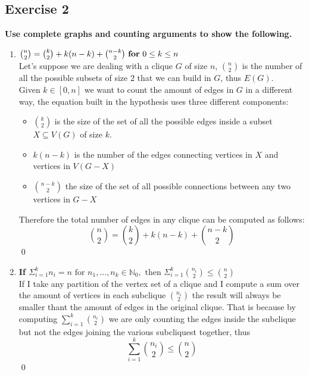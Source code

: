 \subsection*{Exercise 2}
\textbf{Use complete graphs and counting arguments to show the following.}
\begin{enumerate}[\textbf{a)}]
    \boldmath
    \item $\binom{n}{2} = \binom{k}{2} + k(n-k) + \binom{n-k}{2} \text{ \textbf{for} } 0 \leq k \leq n $ \\
    \linebreak
    \unboldmath 
    Let's suppose we are dealing with a clique $G$ of size $n$, $\binom{n}{2}$ is the number of all the possible subsets of size $2$ that we can build in $G$, thus $E(G)$.\\\linebreak
    Given $k \in [0, n]$ we want to count the amount of edges in $G$ in a different way, the equation built in the hypothesis uses three different components:
    \begin{itemize}
        \item $\binom{k}{2}$ is the size of the set of all the possible edges inside a subset $X \subseteq V(G)$ of size $k$.
        \item $k(n - k)$ is the number of the edges connecting vertices in $X$ and vertices in $V(G - X)$
        \item $\binom{n - k}{2}$ the size of the set of all possible connections between any two vertices in $G - X$
    \end{itemize}
    Therefore the total number of edges in any clique can be computed as follows:
    \begin{equation*}
        \binom{n}{2} = \binom{k}{2} + k(n-k) + \binom{n-k}{2}
    \end{equation*}
    \qed
    \boldmath
    \item \textbf{If $\Sigma^k_{i=1}n_i = n \text{ for } n_1, ..., n_k \in \mathbb{N}_0, \text{ then } \Sigma^k_{i=1} \binom{n_i}{2} \leq \binom{n}{2}$} \\\linebreak 
    \unboldmath
    If I take any partition of the vertex set of a clique and I compute a sum over the amount of vertices in each subclique $\binom{n_i}{2}$ the result will always be smaller thant the amount of edges in the original clique. That is because by computing $\sum_{i = 1}^k \binom{n_i}{2}$ we are only counting the edges inside the subclique but not the edges joining the various subcliquest together, thus
    \begin{equation*}
        \sum_{i = 1}^k \binom{n_i}{2} \leq \binom{n}{2}
    \end{equation*}
    \qed
\end{enumerate}
